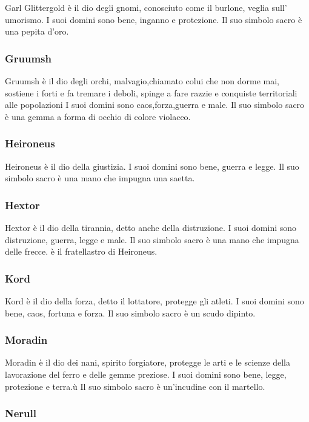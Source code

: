 \documentclass[a4paper,12pt]{book}
\begin{document}
Garl Glittergold è il dio degli gnomi, conosciuto come il burlone, veglia sull' umorismo.
I suoi domini sono bene, inganno e protezione.
Il suo simbolo sacro è una pepita d'oro.

\subsubsection{Gruumsh}

Gruumsh è il dio degli orchi, malvagio,chiamato colui che non dorme mai, sostiene i forti e fa tremare i deboli, spinge a fare razzie e conquiste territoriali alle popolazioni
I suoi domini sono caos,forza,guerra e male.
Il suo simbolo sacro è una gemma a forma di occhio di colore violaceo.

\subsubsection{Heironeus}

Heironeus è il dio della giustizia.
I suoi domini sono bene, guerra e legge.
Il suo simbolo sacro è una mano che impugna una saetta.

\subsubsection{Hextor}

Hextor è il dio della tirannia, detto anche della distruzione.
I suoi domini sono distruzione, guerra, legge e male.
Il suo simbolo sacro è una mano che impugna delle frecce.
è il fratellastro di Heironeus.

\subsubsection{Kord}

Kord è il dio della forza, detto il lottatore, protegge gli atleti.
I suoi domini sono bene, caos, fortuna e forza.
Il suo simbolo sacro è un scudo dipinto.

\subsubsection{Moradin}

Moradin è il dio dei nani, spirito forgiatore, protegge le arti e le scienze della lavorazione del ferro e delle gemme preziose.
I suoi domini sono bene, legge, protezione e terra.ù
Il suo simbolo sacro è un'incudine con il martello.

\subsubsection{Nerull}
\end{document}
